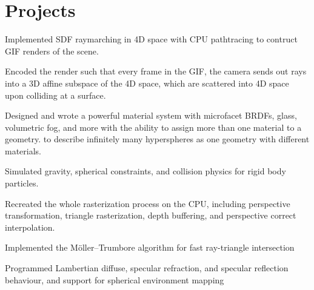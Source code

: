 \section{Projects}

\begin{resumeItem}
\begin{resumeList}
    \item Implemented SDF raymarching in 4D space with CPU pathtracing to contruct GIF renders of the scene.
    \item Encoded the render such that every frame in the GIF, the camera sends out rays into a 3D affine subspace of the 4D space, which are scattered into 4D space upon colliding at a surface.
    \item Designed and wrote a powerful material system with microfacet BRDFs, glass, volumetric fog, and more with the ability to assign more than one material to a geometry. to describe infinitely many hyperspheres as one geometry with different materials.
\end{resumeList}
\end{resumeItem}

\begin{resumeItem}
\begin{resumeList}
    \item Simulated gravity, spherical constraints, and collision physics for rigid body particles.
\end{resumeList}
\end{resumeItem}

\begin{resumeItem}
\begin{resumeList}
    \item Recreated the whole rasterization process on the CPU, including perspective transformation, triangle rasterization, depth buffering, and perspective correct interpolation.
\end{resumeList}
\end{resumeItem}

\begin{resumeItem}
\begin{resumeList}
    \item Implemented the Möller–Trumbore algorithm for fast ray-triangle intersection
    \item Programmed Lambertian diffuse, specular refraction, and specular reflection behaviour, and support for spherical environment mapping
\end{resumeList}
\end{resumeItem}

